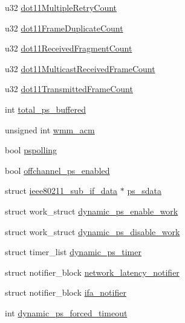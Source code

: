 \begin{DoxyCompactItemize}
\item 
u32 \hyperlink{structieee80211__local_ae955651cdcc433421b2e87c12dab7dc2}{dot11\-Multiple\-Retry\-Count}
\item 
u32 \hyperlink{structieee80211__local_a13a04493892b47783b35445d32ad0aca}{dot11\-Frame\-Duplicate\-Count}
\item 
u32 \hyperlink{structieee80211__local_af8de4e957fa887e3f6c08120930c709e}{dot11\-Received\-Fragment\-Count}
\item 
u32 \hyperlink{structieee80211__local_ae2b04efb04664b259f8e6913707578ac}{dot11\-Multicast\-Received\-Frame\-Count}
\item 
u32 \hyperlink{structieee80211__local_a3067059726ca5e76782a558090bb0d44}{dot11\-Transmitted\-Frame\-Count}
\item 
int \hyperlink{structieee80211__local_a539e95055f6bd55d800085aec0180d86}{total\-\_\-ps\-\_\-buffered}
\item 
unsigned int \hyperlink{structieee80211__local_ae7863966f2b9005eeb21a687f9f5a5a3}{wmm\-\_\-acm}
\item 
bool \hyperlink{structieee80211__local_ab5292154aefaae54f246320fd4afbf11}{pspolling}
\item 
bool \hyperlink{structieee80211__local_a6d0fffdd77c973b707ec9e1955744f88}{offchannel\-\_\-ps\-\_\-enabled}
\item 
struct \hyperlink{structieee80211__sub__if__data}{ieee80211\-\_\-sub\-\_\-if\-\_\-data} $\ast$ \hyperlink{structieee80211__local_af1cdea8e67f896a2208f1e05403a5bda}{ps\-\_\-sdata}
\item 
struct work\-\_\-struct \hyperlink{structieee80211__local_a0bea55b19dc8be14df12be0efa29ef2c}{dynamic\-\_\-ps\-\_\-enable\-\_\-work}
\item 
struct work\-\_\-struct \hyperlink{structieee80211__local_ae86c9b970f2f92364edee6f3002cae9e}{dynamic\-\_\-ps\-\_\-disable\-\_\-work}
\item 
struct timer\-\_\-list \hyperlink{structieee80211__local_a7cd1b6141c7f2492a8b286e9e013ae73}{dynamic\-\_\-ps\-\_\-timer}
\item 
struct notifier\-\_\-block \hyperlink{structieee80211__local_a0bcd7033eb509ae3bb60ce10a09a48b3}{network\-\_\-latency\-\_\-notifier}
\item 
struct notifier\-\_\-block \hyperlink{structieee80211__local_acb6a252b9a72983b1cd445b3f4e99f50}{ifa\-\_\-notifier}
\item 
int \hyperlink{structieee80211__local_af82b7e878824a6ab444850f585b064d2}{dynamic\-\_\-ps\-\_\-forced\-\_\-timeout}

\end{DoxyCompactItemize}
